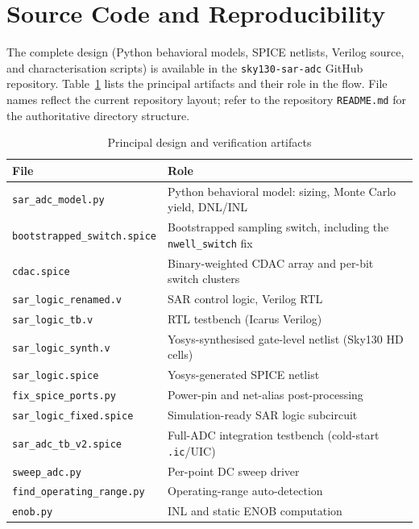 \documentclass[12pt, a4paper]{article}
\begin{document}
\appendix

\section{Source Code and Reproducibility}
\label{appendix:source}

The complete design (Python behavioral models, SPICE netlists, Verilog source, and characterisation scripts) is available in the \texttt{sky130-sar-adc} GitHub repository. %
Table~\ref{tab:artifacts} lists the principal artifacts and their role in the flow. File names reflect the current repository layout; refer to the repository \texttt{README.md} for the authoritative directory structure.

\begin{table}[H]
    \centering
    \caption{Principal design and verification artifacts}
    \label{tab:artifacts}
    \begin{tabular}{@{}ll@{}}
        \toprule
        File & Role \\
        \midrule
        \texttt{sar\_adc\_model.py} & Python behavioral model: sizing, Monte Carlo yield, DNL/INL \\
        \texttt{bootstrapped\_switch.spice} & Bootstrapped sampling switch, including the \texttt{nwell\_switch} fix \\
        \texttt{cdac.spice} & Binary-weighted CDAC array and per-bit switch clusters \\
        \texttt{sar\_logic\_renamed.v} & SAR control logic, Verilog RTL \\
        \texttt{sar\_logic\_tb.v} & RTL testbench (Icarus Verilog) \\
        \texttt{sar\_logic\_synth.v} & Yosys-synthesised gate-level netlist (Sky130 HD cells) \\
        \texttt{sar\_logic.spice} & Yosys-generated SPICE netlist \\
        \texttt{fix\_spice\_ports.py} & Power-pin and net-alias post-processing \\
        \texttt{sar\_logic\_fixed.spice} & Simulation-ready SAR logic subcircuit \\
        \texttt{sar\_adc\_tb\_v2.spice} & Full-ADC integration testbench (cold-start \texttt{.ic}/UIC) \\
        \texttt{sweep\_adc.py} & Per-point DC sweep driver \\
        \texttt{find\_operating\_range.py} & Operating-range auto-detection \\
        \texttt{enob.py} & INL and static ENOB computation \\
        \bottomrule
    \end{tabular}
\end{table}
\end{document}
